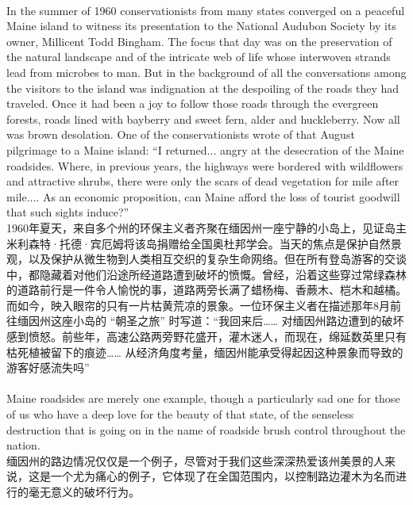 \documentclass{article}
\begin{document}
\\
In the summer of 1960 conservationists from many states converged on a peaceful Maine island to witness its presentation to the National Audubon Society by its owner, Millicent Todd Bingham. The focus that day was on the preservation of the natural landscape and of the intricate web of life whose interwoven strands lead from microbes to man. But in the background of all the conversations among the visitors to the island was indignation at the despoiling of the roads they had traveled. Once it had been a joy to follow those roads through the evergreen forests, roads lined with bayberry and sweet fern, alder and huckleberry. Now all was brown desolation. One of the conservationists wrote of that August pilgrimage to a Maine island: “I returned... angry at the desecration of the Maine roadsides. Where, in previous years, the highways were bordered with wildflowers and attractive shrubs, there were only the scars of dead vegetation for mile after mile.... As an economic proposition, can Maine afford the loss of tourist goodwill that such sights induce?”\\
1960年夏天，来自多个州的环保主义者齐聚在缅因州一座宁静的小岛上，见证岛主米利森特·托德·宾厄姆将该岛捐赠给全国奥杜邦学会。当天的焦点是保护自然景观，以及保护从微生物到人类相互交织的复杂生命网络。但在所有登岛游客的交谈中，都隐藏着对他们沿途所经道路遭到破坏的愤慨。曾经，沿着这些穿过常绿森林的道路前行是一件令人愉悦的事，道路两旁长满了蜡杨梅、香蕨木、桤木和越橘。而如今，映入眼帘的只有一片枯黄荒凉的景象。一位环保主义者在描述那年8月前往缅因州这座小岛的 “朝圣之旅” 时写道：“我回来后…… 对缅因州路边遭到的破坏感到愤怒。前些年，高速公路两旁野花盛开，灌木迷人，而现在，绵延数英里只有枯死植被留下的痕迹…… 从经济角度考量，缅因州能承受得起因这种景象而导致的游客好感流失吗” \\

\\
Maine roadsides are merely one example, though a particularly sad one for those of us who have a deep love for the beauty of that state, of the senseless destruction that is going on in the name of roadside brush control throughout the nation.\\
缅因州的路边情况仅仅是一个例子，尽管对于我们这些深深热爱该州美景的人来说，这是一个尤为痛心的例子，它体现了在全国范围内，以控制路边灌木为名而进行的毫无意义的破坏行为。\\ 
\end{document}
